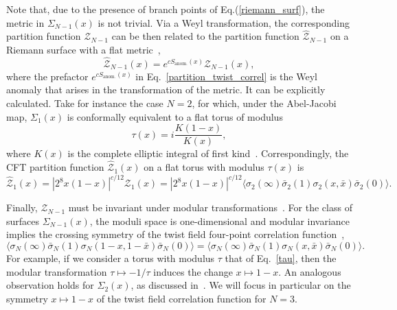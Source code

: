 \documentclass[a4paper,11pt]{article}
\begin{document}
Note that, due to the presence of branch points of Eq.(\ref{riemann_surf}), the metric in $\Sigma_{N-1}(x)$ is not trivial.  Via a Weyl transformation, the corresponding partition function $\mathcal{Z}_{N-1}$ can be then related to the partition function $\mathcal{\hat{Z}}_{N-1}$ on a Riemann surface with a flat metric~\cite{Lunin},  
\begin{equation}\label{partition_twist_correl}
 \mathcal{\hat{Z}}_{N-1}(x)=e^{cS_{\text{anom.}}(x)} \mathcal{Z}_{N-1}(x),
\end{equation}
where the prefactor $e^{cS_{\text{anom.}}(x)}$ in Eq.~\eqref{partition_twist_correl} is the Weyl anomaly that arises in the 
transformation of the metric.
It can be explicitly calculated. Take for instance the case $N=2$, for which, under the Abel-Jacobi map, $\Sigma_{1}(x)$ is conformally equivalent to a flat torus of modulus 
\begin{equation}\label{tau}
 \tau(x)=i\frac{K(1-x)}{K(x)}, 
\end{equation}
where $K(x)$ is the complete elliptic integral of first 
kind~\cite{Whittaker}. Correspondingly, the CFT partition function $\mathcal{\hat{Z}}_1(x)$ on a flat torus 
with modulus $\tau(x)$ is~\cite{Lunin}
\begin{equation}\label{partition_torus_twist}
 \mathcal{\hat{Z}}_1(x)=|2^8 x(1-x)|^{c/12} \mathcal{Z}_{1}(x)
 =|2^8 x(1-x)|^{c/12} \langle \sigma_2 (\infty)\bar{\sigma}_2(1)\sigma_2(x, \bar{x})\bar{\sigma}_2(0)\rangle.
\end{equation}

Finally, $\mathcal{Z}_{N-1}$ must be invariant  
under modular transformations~\cite{CardyMod, Cappelli, Cappelli2}.  For the class of surfaces $\Sigma_{N-1}(x)$, the moduli space is one-dimensional and modular invariance implies the crossing
symmetry of the twist field four-point correlation function~\cite{Cardy},
\begin{equation}\label{cross_symmetry}
 \langle \sigma_N(\infty)\bar{\sigma}_N(1)\sigma_N(1-x, 1-\bar{x})\bar{\sigma}_N(0)\rangle=
 \langle \sigma_N(\infty)\bar{\sigma}_N(1)\sigma_N(x, \bar{x})\bar{\sigma}_N(0)\rangle. 
\end{equation}
For example, if we consider a torus with modulus $\tau$ that of Eq.~\eqref{tau},
then the modular transformation $\tau\mapsto-1/\tau$ induces the change
$x\mapsto 1-x$. An analogous observation holds for $\Sigma_{2}(x)$, as discussed in~\cite{Cardy}.
 We will focus in particular on 
the symmetry $x\mapsto 1-x$ of the twist field correlation function for $N=3$. 
\end{document}
